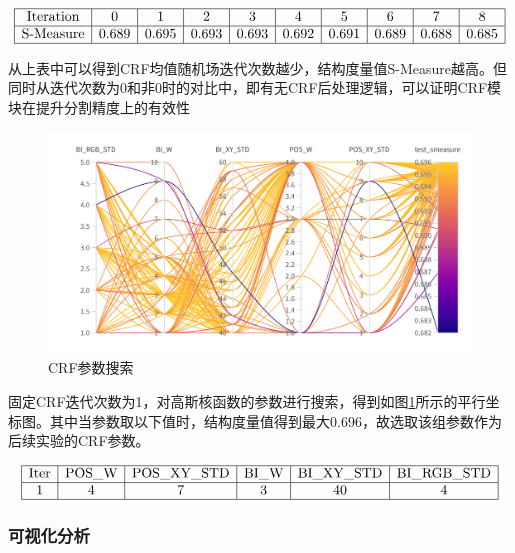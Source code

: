 \documentclass[a4paper,12pt]{ctexart}
\begin{document}
\[\begin{array}{|c|c|c|c|c|c|c|c|c|c|}
    \hline
    \text{Iteration} & 0 & 1 & 2 & 3 & 4 & 5 & 6 & 7 & 8 \\
    \hline
    \text{S-Measure} & 0.689 & 0.695 & 0.693 & 0.693 & 0.692 & 0.691 & 0.689 & 0.688 & 0.685 \\
    \hline
\end{array}
\]

从上表中可以得到CRF均值随机场迭代次数越少，结构度量值S-Measure越高。但同时从迭代次数为0和非0时的对比中，即有无CRF后处理逻辑，可以证明CRF模块在提升分割精度上的有效性

\begin{figure}[h]
    \centering
    \includegraphics[width=\textwidth]{figures/crfparam_search.png}
    \caption{CRF参数搜索}
    \label{fig:crfps}
\end{figure}

固定CRF迭代次数为1，对高斯核函数的参数进行搜索，得到如图\ref{fig:crfps}所示的平行坐标图。其中当参数取以下值时，结构度量值得到最大0.696，故选取该组参数作为后续实验的CRF参数。

\[\begin{array}{|c|c|c|c|c|c|c|c|c|c|}
    \hline
    \text{Iter} & $POS\_W$ & $POS\_XY\_STD$ & $BI\_W$ & $BI\_XY\_STD$ & $BI\_RGB\_STD$ \\
    \hline
    1 & 4 & 7 & 3 & 40 & 4 \\
    \hline
\end{array}
\]

\subsubsection{可视化分析}
\label{sec:visual}
\end{document}
